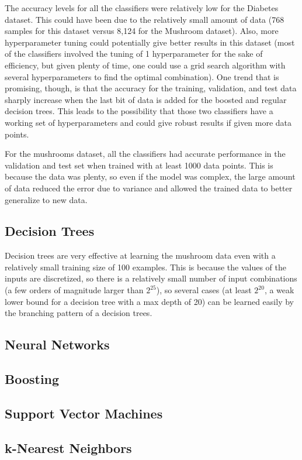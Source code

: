 \documentclass[11pt]{article}
\begin{document}
        The accuracy levels for all the classifiers were relatively low for the Diabetes dataset. This could have been due to the relatively small amount of data (768 samples for this dataset versus 8,124 for the Mushroom dataset). Also, more hyperparameter tuning could potentially give better results in this dataset (most of the classifiers involved the tuning of 1 hyperparameter for the sake of efficiency, but given plenty of time, one could use a grid search algorithm with several hyperparameters to find the optimal combination). One trend that is promising, though, is that the accuracy for the training, validation, and test data sharply increase when the last bit of data is added for the boosted and regular decision trees. This leads to the possibility that those two classifiers have a working set of hyperparameters and could give robust results if given more data points.

        For the mushrooms dataset, all the classifiers had accurate performance in the validation and test set when trained with at least 1000 data points. This is because the data was plenty, so even if the model was complex, the large amount of data reduced the error due to variance and allowed the trained data to better generalize to new data.


        \subsection{Decision Trees}


        Decision trees are very effective at learning the mushroom data even with a relatively
        small training size of 100 examples. This is because the values of the inputs
        are discretized, so there is a relatively small number of input combinations (a few orders
        of magnitude larger than $2^{25}$), so several cases (at least $2^{20}$, a weak lower bound for a decision tree with a max depth of 20) can be learned easily by the branching
        pattern of a decision trees.

        \subsection{Neural Networks}


        \subsection{Boosting}

        
        \subsection{Support Vector Machines}


        \subsection{k-Nearest Neighbors}

        

    
\end{document}
